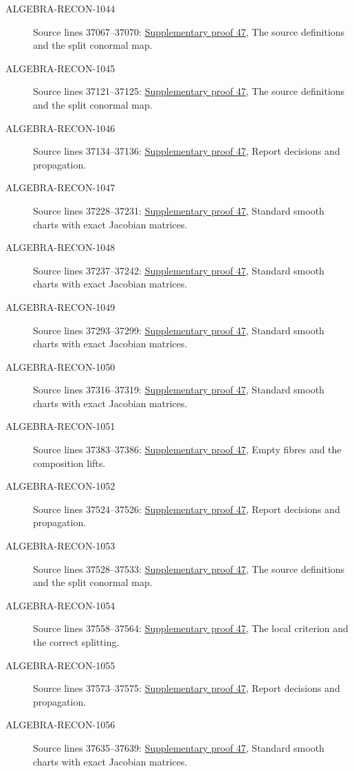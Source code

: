 \begin{description}
\item[ALGEBRA-RECON-1044] Source lines 37067--37070: \hyperlink{algebra_smooth_notes_20260928}{Supplementary proof 47}, The source definitions and the split conormal map.
\item[ALGEBRA-RECON-1045] Source lines 37121--37125: \hyperlink{algebra_smooth_notes_20260928}{Supplementary proof 47}, The source definitions and the split conormal map.
\item[ALGEBRA-RECON-1046] Source lines 37134--37136: \hyperlink{algebra_smooth_notes_20260928}{Supplementary proof 47}, Report decisions and propagation.
\item[ALGEBRA-RECON-1047] Source lines 37228--37231: \hyperlink{algebra_smooth_notes_20260928}{Supplementary proof 47}, Standard smooth charts with exact Jacobian matrices.
\item[ALGEBRA-RECON-1048] Source lines 37237--37242: \hyperlink{algebra_smooth_notes_20260928}{Supplementary proof 47}, Standard smooth charts with exact Jacobian matrices.
\item[ALGEBRA-RECON-1049] Source lines 37293--37299: \hyperlink{algebra_smooth_notes_20260928}{Supplementary proof 47}, Standard smooth charts with exact Jacobian matrices.
\item[ALGEBRA-RECON-1050] Source lines 37316--37319: \hyperlink{algebra_smooth_notes_20260928}{Supplementary proof 47}, Standard smooth charts with exact Jacobian matrices.
\item[ALGEBRA-RECON-1051] Source lines 37383--37386: \hyperlink{algebra_smooth_notes_20260928}{Supplementary proof 47}, Empty fibres and the composition lifts.
\item[ALGEBRA-RECON-1052] Source lines 37524--37526: \hyperlink{algebra_smooth_notes_20260928}{Supplementary proof 47}, Report decisions and propagation.
\item[ALGEBRA-RECON-1053] Source lines 37528--37533: \hyperlink{algebra_smooth_notes_20260928}{Supplementary proof 47}, The source definitions and the split conormal map.
\item[ALGEBRA-RECON-1054] Source lines 37558--37564: \hyperlink{algebra_smooth_notes_20260928}{Supplementary proof 47}, The local criterion and the correct splitting.
\item[ALGEBRA-RECON-1055] Source lines 37573--37575: \hyperlink{algebra_smooth_notes_20260928}{Supplementary proof 47}, Report decisions and propagation.
\item[ALGEBRA-RECON-1056] Source lines 37635--37639: \hyperlink{algebra_smooth_notes_20260928}{Supplementary proof 47}, Standard smooth charts with exact Jacobian matrices.

\end{description}
